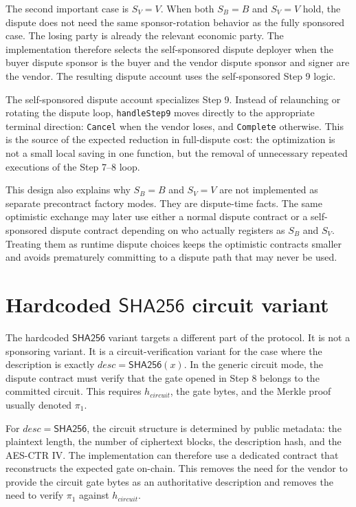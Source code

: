 The second important case is \(S_V=V\). When both \(S_B=B\) and \(S_V=V\) hold, the dispute
does not need the same sponsor-rotation behavior as the fully sponsored case. The losing
party is already the relevant economic party. The implementation therefore selects the
self-sponsored dispute deployer when the buyer dispute sponsor is the buyer and the vendor
dispute sponsor and signer are the vendor. The resulting dispute account uses the
self-sponsored Step 9 logic.

The self-sponsored dispute account specializes Step 9. Instead of relaunching or rotating
the dispute loop, \texttt{handleStep9} moves directly to the appropriate terminal direction:
\texttt{Cancel} when the vendor loses, and \texttt{Complete} otherwise. This is the source of
the expected reduction in full-dispute cost: the optimization is not a small local saving in
one function, but the removal of unnecessary repeated executions of the Step 7--8 loop.

This design also explains why \(S_B=B\) and \(S_V=V\) are not implemented as separate
precontract factory modes. They are dispute-time facts. The same optimistic exchange may
later use either a normal dispute contract or a self-sponsored dispute contract depending on
who actually registers as \(S_B\) and \(S_V\). Treating them as runtime dispute choices keeps
the optimistic contracts smaller and avoids prematurely committing to a dispute path that
may never be used.

\section[Hardcoded SHA-256 circuit variant]{Hardcoded \(\mathsf{SHA256}\) circuit variant}

The hardcoded \(\mathsf{SHA256}\) variant targets a different part of the protocol. It is
not a sponsoring variant. It is a circuit-verification variant for the case where the
description is exactly \(desc=\mathsf{SHA256}(x)\). In the generic circuit mode, the dispute
contract must verify that the gate opened in Step 8 belongs to the committed circuit. This
requires \(h_{\mathit{circuit}}\), the gate bytes, and the Merkle proof usually denoted
\(\pi_1\).

For \(desc=\mathsf{SHA256}\), the circuit structure is determined by public metadata: the
plaintext length, the number of ciphertext blocks, the description hash, and the AES-CTR IV.
The implementation can therefore use a dedicated contract that reconstructs the expected
gate on-chain. This removes the need for the vendor to provide the circuit gate bytes as an
authoritative description and removes the need to verify \(\pi_1\) against
\(h_{\mathit{circuit}}\).

